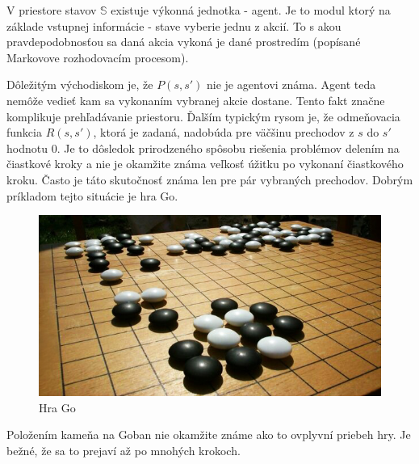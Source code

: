 V priestore stavov $\mathbb{S}$ existuje výkonná jednotka - agent. Je to modul
ktorý na základe vstupnej informácie - stave vyberie jednu z akcií. To s akou pravdepodobnosťou
sa daná akcia vykoná je dané prostredím (popísané Markovove rozhodovacím procesom).

Dôležitým východiskom je, že $P(s, s')$ nie je agentovi známa. Agent teda nemôže
vedieť kam sa vykonaním vybranej akcie dostane. Tento fakt značne komplikuje prehľadávanie
priestoru.
Ďalším typickým rysom je, že odmeňovacia funkcia $R(s, s')$, ktorá je zadaná,
nadobúda pre väčšinu prechodov z $s$ do $s'$ hodnotu 0. Je to dôsledok prirodzeného
spôsobu riešenia problémov delením na čiastkové kroky a nie je okamžite známa
veľkosť úžitku po vykonaní čiastkového kroku. Často je táto skutočnosť známa
len pre pár vybraných prechodov.
Dobrým príkladom tejto situácie je hra Go.

\begin{figure}[!htb]
\center
\includegraphics[scale=.5]{../pictures/go2.jpg}
\caption{Hra Go}
\label{img:go_game}
\end{figure}

Položením kameňa na Goban nie okamžite známe ako to ovplyvní priebeh hry.
Je bežné, že sa to prejaví až po mnohých krokoch.
